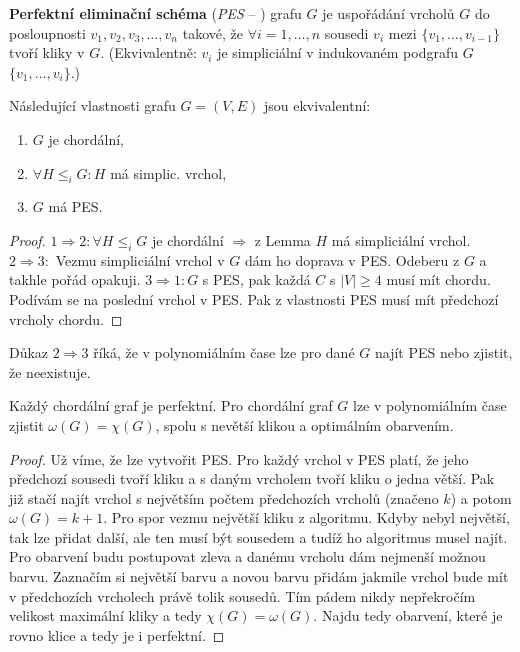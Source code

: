 \begin{definice}
	\textbf{Perfektní eliminační schéma} (\textit{PES} -- \PES) grafu $G$ je uspořádání vrcholů $G$ do posloupnosti $v_{1}, v_{2}, v_{3}, \dots, v_{n}$ takové, že $\forall i = 1, \dots ,n$ sousedi $v_{i}$ mezi $\{v_{1}, \dots, v_{i-1}\}$ tvoří kliky v $G$. (Ekvivalentně: $v_{i}$ je simpliciální v indukovaném podgrafu $G$ $\{v_{1}, \dots, v_{i}\}$.)
\end{definice}

\begin{veta}
	Následující vlastnosti grafu $G = (V,E)$ jsou ekvivalentní:
	
	\begin{enumerate}
		\item $G$ je chordální,
		\item $\forall H \leq_{i} G: H$ má simplic. vrchol,
		\item $G$ má PES.
	\end{enumerate}
\end{veta}

\begin{proof}
	$1 \Rightarrow 2: \forall H \leq_{i} G$ je chordální $\Rightarrow$ z Lemma $H$ má simpliciální vrchol. $2 \Rightarrow 3:$ Vezmu simpliciální vrchol v $G$ dám ho doprava v PES. Odeberu z $G$ a takhle pořád opakuji. $3 \Rightarrow 1: G$ s PES, pak každá $C$ s $|V| \geq 4$ musí mít chordu. Podívám se na poslední vrchol v PES. Pak z vlastnosti PES musí mít předchozí vrcholy chordu.
\end{proof}

\begin{dusl}
	Důkaz $2 \Rightarrow 3$ říká, že v polynomiálním čase lze pro dané $G$ najít PES nebo zjistit, že neexistuje.
\end{dusl}

\begin{veta}
	Každý chordální graf je perfektní. Pro chordální graf $G$ lze v polynomiálním čase zjistit $\omega(G) = \chi(G)$, spolu s nevětší klikou a optimálním obarvením.
\end{veta}

\begin{proof}
	Už víme, že lze vytvořit PES. Pro každý vrchol v PES platí, že jeho předchozí sousedi tvoří kliku a s daným vrcholem tvoří kliku o jedna větší. Pak již stačí najít vrchol s největším počtem předchozích vrcholů (značeno $k$) a potom $\omega(G) = k+1$. Pro spor vezmu největší kliku z algoritmu. Kdyby nebyl největší, tak lze přidat další, ale ten musí být sousedem a tudíž ho algoritmus musel najít. Pro obarvení budu postupovat zleva a danému vrcholu dám nejmenší možnou barvu. Zaznačím si největší barvu a novou barvu přidám jakmile vrchol bude mít v předchozích vrcholech právě tolik sousedů. Tím pádem nikdy nepřekročím velikost maximální kliky a tedy $\chi(G) = \omega(G)$. Najdu tedy obarvení, které je rovno klice a tedy je i perfektní.
\end{proof}
